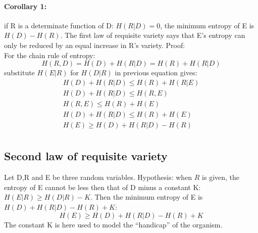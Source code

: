 \paragraph{Corollary 1:}
if R is a determinate function of D: $H(R|D)=0$, the minimum entropy of E is $H(D)-H(R)$.
The first law of requisite variety says that E's entropy can only be reduced by
 an equal increase in R's variety.
Proof:\\
For the chain rule of entropy:
\begin{equation}
H(R,D)=H(D)+H(R|D)=H(R)+H(R|D)
\end{equation}
substitute $H(E|R)$ for $H(D|R)$ in previous equation gives:
\begin{eqnarray}
H(D)+H(R|D) \leq H(R)+H(R|E)\\
H(D)+H(R|D) \leq H(R,E)\\
H(R,E) \leq H(R)+H(E)\\
H(D) +H(R|D)\leq H(R)+H(E)\\
H(E) \geq H(D) +H(R|D)-H(R)\\
\end{eqnarray}

\subsection{Second law of requisite variety}
Let D,R and E be three random variables.
Hypothesis: when $R$ is given, the entropy of E cannot be less then that of
 D minus a constant K: $H(E|R)\geq H(D|R)-K$.
Then the minimum entropy of E is $H(D)+H(R|D)-H(R)+K$:
\begin{equation}
H(E)\geq H(D)+H(R|D)-H(R)+K
\end{equation}
The constant K is here used to model the ``handicap'' of the organism.

